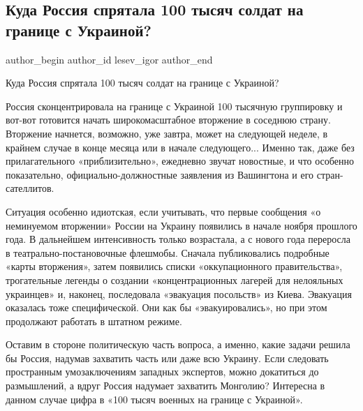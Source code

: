  
 
 
 
 
 
\subsection{Куда Россия спрятала 100 тысяч солдат на границе с Украиной?}
\label{sec:13_02_2022.tg.lesev_igor.1.kuda_rossia_sprjatala}
 
\ifcmt
 author_begin
   author_id lesev_igor
 author_end
\fi

Куда Россия спрятала 100 тысяч солдат на границе с Украиной?

Россия сконцентрировала на границе с Украиной 100 тысячную группировку и
вот-вот готовится начать широкомасштабное вторжение в соседнюю страну.
Вторжение начнется, возможно, уже завтра, может на следующей неделе, в крайнем
случае в конце месяца или в начале следующего... Именно так, даже без
прилагательного «приблизительно», ежедневно звучат новостные, и что особенно
показательно, официально-должностные заявления из Вашингтона и его
стран-сателлитов.

Ситуация особенно идиотская, если учитывать, что первые сообщения «о неминуемом
вторжении» России на Украину появились в начале ноября прошлого года. В
дальнейшем интенсивность только возрастала, а с нового года переросла в
театрально-постановочные флешмобы. Сначала публиковались подробные «карты
вторжения», затем появились списки «оккупационного правительства», трогательные
легенды о создании «концентрационных лагерей для нелояльных украинцев» и,
наконец, последовала «эвакуация посольств» из Киева. Эвакуация оказалась тоже
специфической. Они как бы «эвакуировались», но при этом продолжают работать в
штатном режиме.

Оставим в стороне политическую часть вопроса, а именно, какие задачи решила бы
Россия, надумав захватить часть или даже всю Украину. Если следовать
пространным умозаключениям западных экспертов, можно докатиться до размышлений,
а вдруг Россия надумает захватить Монголию? Интересна в данном случае цифра в
«100 тысяч военных на границе с Украиной».

